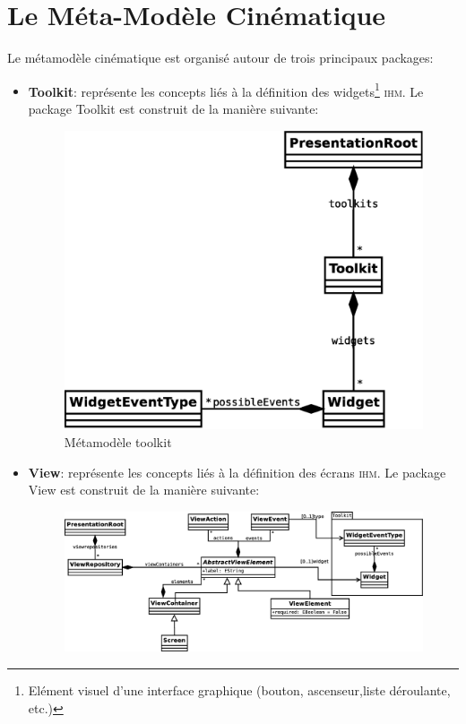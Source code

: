 \section{Le Méta-Modèle Cinématique}
Le métamodèle cinématique est organisé autour de trois principaux packages:
\begin{itemize}
  \item \textbf{Toolkit}: représente les concepts liés à la définition des widgets\footnote{Elément visuel d'une interface graphique (bouton, ascenseur,liste déroulante, etc.)} \textsc{ihm}.
\newline
Le package Toolkit est construit de la manière suivante:
\newline
\begin{figure}[htb]
  \centering
  \includegraphics[scale=.3]{img/toolkit.eps}
  \caption{Métamodèle toolkit}
  \label{fig:Métamodèle Toolkit}
\end{figure}
  \item \textbf{View}: représente les concepts liés à la définition des écrans \textsc{ihm}.
\newline
Le package View est construit de la manière suivante:
\newline
\begin{figure}[H]
  \centering
  \includegraphics[scale=.3]{img/view.eps}

\end{figure}
\end{itemize}

